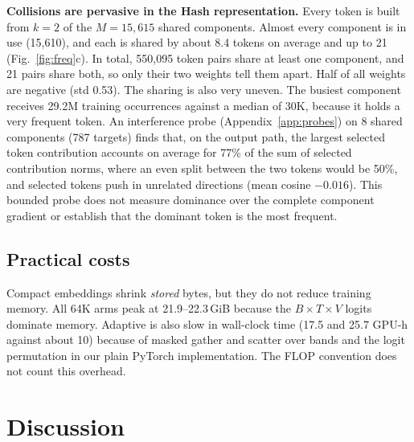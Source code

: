 \documentclass[10pt,a4paper]{article}
\begin{document}
\textbf{Collisions are pervasive in the Hash representation.} Every token is built from $k=2$ of the $M=15{,}615$
shared components. Almost every component is in use (15,610), and each is shared by about 8.4 tokens on
average and up to 21 (Fig.~\ref{fig:freq}c). In total, 550,095 token pairs share at least one component, and
21 pairs share both, so only their two weights tell them apart. Half of all weights are negative (std 0.53).
The sharing is also very uneven. The
busiest component receives 29.2M training occurrences against a median of 30K, because it holds a very
frequent token. An interference probe (Appendix~\ref{app:probes}) on 8 shared components (787 targets)
finds that, on the output path, the largest selected token contribution accounts on average for 77\% of the
sum of selected contribution norms, where an even split between the two tokens would be 50\%, and selected tokens push in unrelated directions (mean cosine $-0.016$). This bounded probe does not
measure dominance over the complete component gradient or establish that the dominant token is the most frequent.

\subsection{Practical costs}
Compact embeddings shrink \emph{stored} bytes, but they do not reduce training memory. All 64K arms peak at
21.9--22.3\,GiB because the $B\times T\times V$ logits dominate memory. Adaptive is also slow in wall-clock
time (17.5 and 25.7 GPU-h against about 10) because of masked gather and scatter over bands and the logit
permutation in our plain PyTorch implementation. The FLOP convention does not count this overhead.

\section{Discussion}
\label{sec:discussion}
\end{document}
